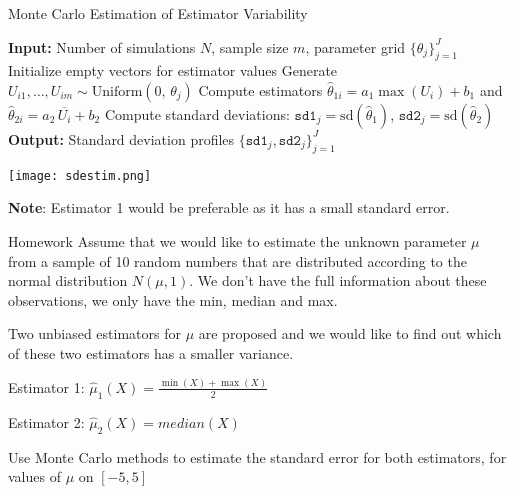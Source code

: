 \documentclass[8pt]{beamer}
\begin{document}
\begin{frame}
\begin{algorithm}[H]
\caption{Monte Carlo Estimation of Estimator Variability}
\label{alg:generalized-sd-estimation}
\begin{algorithmic}[1]
  \State \textbf{Input:} Number of simulations $N$, sample size $m$, parameter grid $\{\theta_j\}_{j=1}^J$
    \State Initialize empty vectors for estimator values
      \State Generate $U_{i1}, \ldots, U_{im} \sim \text{Uniform}(0,\, \theta_j)$
      \State Compute estimators $\hat{\theta}_{1i} = a_1 \max(U_i) + b_1$ and $\hat{\theta}_{2i} = a_2 \, \overline{U_i} + b_2$
    \EndFor
    \State Compute standard deviations: $\texttt{sd1}_j = \text{sd}(\hat{\theta}_{1})$, \quad $\texttt{sd2}_j = \text{sd}(\hat{\theta}_{2})$
  \EndFor
  \State \textbf{Output:} Standard deviation profiles $\{\texttt{sd1}_j, \texttt{sd2}_j\}_{j=1}^J$
\end{algorithmic}
\end{algorithm}
\end{frame}

\begin{frame}
\begin{center}
\texttt{[image: sdestim.png]}
\end{center}

\textbf{Note}: Estimator 1 would be preferable as it has a small standard error.
\end{frame}

\begin{frame}{Homework} 
Assume that we would like to estimate the unknown parameter $\mu$ from a sample of 10 random numbers that are distributed according to the normal distribution $N(\mu,1)$. We don't have the full information about these observations, we only have the min, median and max.

Two unbiased estimators for $\mu$ are proposed and we would like to find out which of these two estimators has a smaller variance.

\vspace{3mm}

Estimator 1: $\displaystyle{\hat{\mu}_1(X)=\frac{\min(X)+\max(X)}{2}}$

Estimator 2: $\hat{\mu}_2(X)=median(X)$

\vspace{3mm}

Use Monte Carlo methods to estimate the standard error for both estimators, for values of $\mu$ on $[-5,5]$ 
\end{frame}
\end{document}
